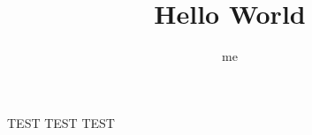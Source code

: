 \documentclass{article}
\author{me}
\title{Hello World}
\begin{document}
  \maketitle
  
  TEST TEST TEST
\end{document}

